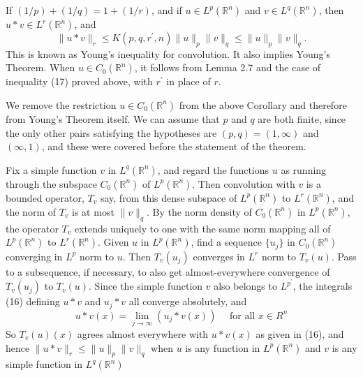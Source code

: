 \begin{corollary}
  If $(1 / p)+(1 / q)=1+(1 / r)$, and if $u \in L^p(\mathbb{R}^n)$ and $v \in L^q(\mathbb{R}^n)$, then $u * v \in L^r(\mathbb{R}^n)$, and
  \[
  \|u * v\|_r \leq K\left(p, q, r^{\prime}, n\right)\|u\|_p\|v\|_q \leq\|u\|_p\|v\|_q .
  \]
  This is known as Young's inequality for convolution. It also implies Young's Theorem. When $u \in C_0(\mathbb{R}^n)$, it follows from Lemma 2.7 and the case of inequality (17) proved above, with $r^{\prime}$ in place of $r$.
\end{corollary}

\begin{para}
  We remove the restriction $u \in C_0(\mathbb{R}^n)$ from the above Corollary and therefore from Young's Theorem itself. We can assume that $p$ and $q$ are both finite, since the only other pairs satisfying the hypotheses are $(p, q)=(1, \infty)$ and $(\infty, 1)$, and these were covered before the statement of the theorem.
  
  Fix a simple function $v$ in $L^q(\mathbb{R}^n)$, and regard the functions $u$ as running through the subspace $C_0(\mathbb{R}^n)$ of $L^p(\mathbb{R}^n)$. Then convolution with $v$ is a bounded operator, $T_v$ say, from this dense subspace of $L^p(\mathbb{R}^n)$ to $L^r(\mathbb{R}^n)$, and the norm of $T_v$ is at most $\|v\|_q$. By the norm density of $C_0(\mathbb{R}^n)$ in $L^p(\mathbb{R}^n)$, the operator $T_v$ extends uniquely to one with the same norm mapping all of $L^p(\mathbb{R}^n)$ to $L^r(\mathbb{R}^n)$.
  Given $u$ in $L^p(\mathbb{R}^n)$, find a sequence $\{u_j\}$ in $C_0(\mathbb{R}^n)$ converging in $L^p$ norm to $u$. Then $T_v(u_j)$ converges in $L^r$ norm to $T_v(u)$. Pass to a subsequence, if necessary,
  to also get almost-everywhere convergence of $T_v(u_j)$ to $T_v(u)$. Since the simple function $v$ also belongs to $L^{p^{\prime}}$, the integrals (16) defining $u * v$ and $u_j * v$ all converge absolutely, and
  \[
  u * v(x)=\lim _{j \rightarrow \infty}\left(u_j * v(x)\right) \quad \text { for all } x \in R^n
  \]
  So $T_v(u)(x)$ agrees almost everywhere with $u * v(x)$ as given in (16), and hence $\|u * v\|_r \leq\|u\|_p\|v\|_q$ when $u$ is any function in $L^p(\mathbb{R}^n)$ and $v$ is any simple function in $L^q(\mathbb{R}^n)$
  

\end{para}
